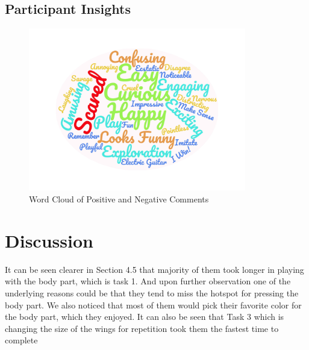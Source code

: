 \subsection{Participant Insights}

\begin{figure}[H]
    \centering
    \includegraphics[width=9.5cm]{figures/NewFigures/wordcloud.jpg}
    \caption{Word Cloud of Positive and Negative Comments}
    \label{fig:wordcloud}
\end{figure}



\section{Discussion}

It can be seen clearer in Section 4.5 that majority of them took longer in playing with the body part, which is task 1. And upon further observation one of the underlying reasons could be that they tend to miss the hotspot for pressing the body part.  We also noticed that most of them would pick their favorite color for the body part, which they enjoyed. It can also be seen that Task 3 which is changing the size of the wings for repetition took them the fastest time to complete

